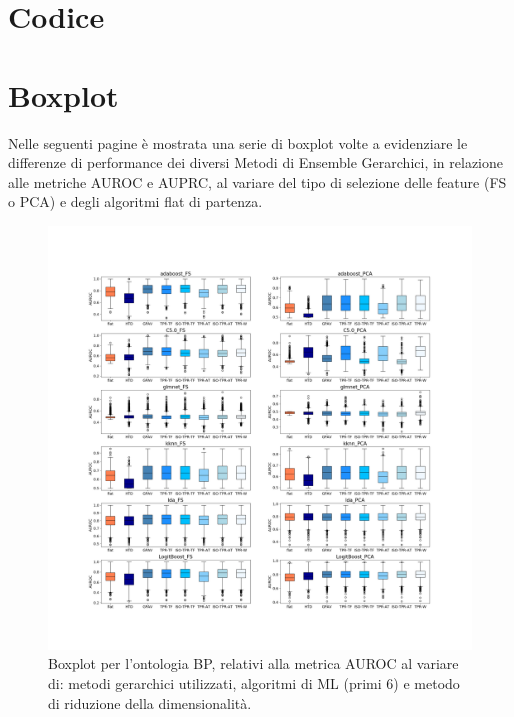 \documentclass[12pt]{report}
\begin{document}
%
\begin{appendices}
\chapter{Codice}


\newpage

\chapter{Boxplot}
Nelle seguenti pagine è mostrata una serie di boxplot volte a evidenziare le differenze di performance dei diversi Metodi di Ensemble Gerarchici, in relazione alle metriche AUROC e AUPRC, al variare del tipo di selezione delle feature (FS o PCA) e degli algoritmi flat di partenza.

\begin{figure}[h]
 \hspace*{-2.6cm}
\includegraphics[scale=0.34]{./images/BP_AUC_1.png}
\caption{\footnotesize{Boxplot per l'ontologia BP, relativi alla metrica AUROC al variare di: metodi gerarchici utilizzati, algoritmi di ML (primi 6) e metodo di riduzione della dimensionalità.}}
\label{BP_AUC_1}
\end{figure}



\end{appendices}
\end{document}

